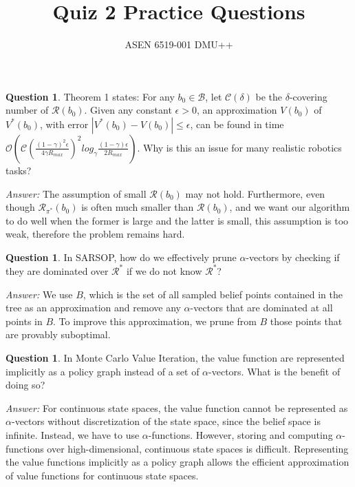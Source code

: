 \documentclass{article}
\title{Quiz 2 Practice Questions}
\author{ASEN 6519-001 DMU++}
\theoremstyle{definition}
\newtheorem{question}[thm]{Question}
\newenvironment{answer}{\noindent\textit{Answer:}}{}
\begin{document}
\maketitle

\begin{question}
Theorem 1 states: For any $b_0 \in \mathcal{B}$, let $\mathcal{C}(\delta)$ be the $\delta$-covering number of $\mathcal{R}(b_0)$. Given any constant $\epsilon > 0$, an approximation $V(b_0)$ of $V^*(b_0)$, with error $|V^*(b_0) - V(b_0)| \leq \epsilon$, can be found in time $\mathcal{O}\left( \mathcal{C} \left( \frac{(1-\gamma)^2\epsilon}{4\gamma R_{max}}\right)^2 log_{\gamma}\frac{(1-\gamma)\epsilon}{2R_{max}}\right)$. Why is this an issue for many realistic robotics tasks?
\end{question}
\begin{answer}
The assumption of small $\mathcal{R}(b_0)$ may not hold. Furthermore, even though $\mathcal{R}_{\pi^*}(b_0)$ is often much smaller than $\mathcal{R}(b_0)$, and we want our algorithm to do well when the former is large and the latter is small, this assumption is too weak, therefore the problem remains hard.
\end{answer}
\\
\par
\begin{question}
In SARSOP, how do we effectively prune $\alpha$-vectors by checking if they are dominated over $\mathcal{R}^*$ if we do not know $\mathcal{R}^*$?
\end{question}
\begin{answer}
We use $B$, which is the set of all sampled belief points contained in the tree as an approximation and remove any $\alpha$-vectors that are dominated at all points in $B$. To improve this approximation, we prune from $B$ those points that are provably suboptimal.
\end{answer}

\begin{question}
In Monte Carlo Value Iteration, the value function are represented implicitly as a policy graph instead of a set of $\alpha$-vectors. What is the benefit of doing so?
\end{question}

\begin{answer}
For continuous state spaces, the value function cannot be represented as $\alpha$-vectors without discretization of the state space, since the belief space is infinite. Instead, we have to use $\alpha$-functions. However, storing and computing $\alpha$-functions over high-dimensional, continuous state spaces is difficult. Representing the value functions implicitly as a policy graph allows the efficient approximation of value functions for continuous state spaces.
\end{answer}
\end{document}
